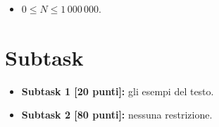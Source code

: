\begin{itemize}[nolistsep, noitemsep]
  \item $0 \le N \le 1\,000\,000$.
\end{itemize}
  
  \section*{Subtask}
  \begin{itemize}
    \item \textbf{Subtask 1 [20 punti]:} gli esempi del testo.
    \item \textbf{Subtask 2 [80 punti]:} nessuna restrizione.
  \end{itemize}
  
